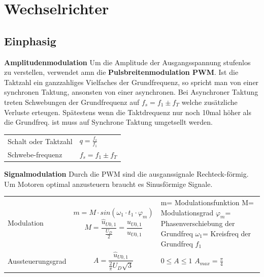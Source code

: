 \section{Wechselrichter}
\subsection{Einphasig}
\textbf{Amplitudenmodulation}\newline
Um die Amplitude der Ausgangsspannung stufenlos zu verstellen, verwendet amn die \textbf{Pulsbreitenmodulation PWM}. \newline
Ist die Taktzahl ein ganzzahliges Vielfaches der Grundfrequenz, so spricht man von einer synchronen Taktung, ansonsten von einer asynchronen.
Bei Asynchroner Taktung treten Schwebungen der Grundfrequenz auf $ f_s = f_1 \pm f_T $ welche zusätzliche Verluste erteugen. Spätestens wenn die Taktdrequenz nur noch 10mal höher als die Grundfreq. ist muss auf Synchrone Taktung umgetsellt werden. \newline
\begin{tabular}{ p{}  p{} }
    Schalt oder Taktzahl&
    $ q = \frac{f_s}{f_1} $
    \\
    
    Schwebe-frequenz&
    $ f_s = f_1 \pm f_T $
    \\   
\end{tabular}

\textbf{Signalmodulation}\newline
Durch die PWM sind die ausganssignale Rechteck-förmig. Um Motoren optimal anzusteuern braucht es Sinusförmige Signale.\newline

\begin{tabular}{ p{}  p{} p{}}
    Modulation&
    $$ m=M\cdot sin(\omega_1 \cdot t_1 \cdot \varphi_m) $$\newline
    $$  M= \frac{\hat{u}_{U0,1}}{\frac{U_D}{2}} =\frac{\hat{u}_{U0,1}}{u_{U0,1}} $$&
    m= Modulationsfunktion\newline
    M= Modulationsgrad\newline
    $ \varphi_m $= Phasenverschiebung der Grundfreq\newline
    $ \omega_1 $= Kreisfreq der Grundfreq $ f_1 $
    \\
    
    Aussteuerungsgrad&
    $$A = \frac{\hat{u}_{U0,1}}{\frac{2}{\pi}U_D\sqrt{3}} $$&
    $ 0\leq A \leq 1 $\newline
    $ A_{max}=\frac{\pi}{4} $
    \\   
\end{tabular}

